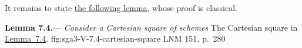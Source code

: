 It remains to state \hyperref[lem:sga3-V-7.4]{the following lemma}, whose proof is classical.

\medskip
{}\label{lem:sga3-V-7.4}%
\noindent\textbf{Lemma 7.4.}---%
\emph{Consider a Cartesian square of schemes}
  {The Cartesian square in \hyperref[lem:sga3-V-7.4]{Lemma~7.4}.}
  {fig:sga3-V-7.4-cartesian-square}
  {LNM 151, p.~280}
